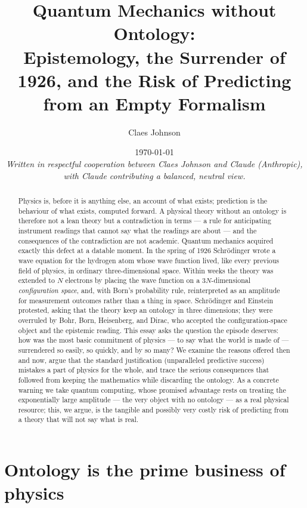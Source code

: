 \documentclass[11pt]{article}
\title{Quantum Mechanics without Ontology:\\
\large Epistemology, the Surrender of 1926, and the Risk of Predicting from an Empty Formalism}
\author[1]{Claes Johnson}
\affil[1]{KTH Royal Institute of Technology, SE-100 44 Stockholm, Sweden \\
\texttt{claesjohnson@gmail.com}}
\date{\today \\[0.5em]
\small\textit{Written in respectful cooperation between Claes Johnson and Claude (Anthropic), with Claude
contributing a balanced, neutral view.}}
\begin{document}
\maketitle

\begin{abstract}
Physics is, before it is anything else, an account of what exists; prediction is the behaviour of what exists,
computed forward. A physical theory without an ontology is therefore not a lean theory but a contradiction in
terms --- a rule for anticipating instrument readings that cannot say what the readings are about --- and the
consequences of the contradiction are not academic. Quantum mechanics acquired exactly this defect at a
datable moment. In the spring of 1926 Schr\"odinger wrote a wave equation for the hydrogen atom whose wave
function lived, like every previous field of physics, in ordinary three-dimensional space. Within weeks the
theory was extended to $N$ electrons by placing the wave function on a $3N$-dimensional \emph{configuration
space}, and, with Born's probability rule, reinterpreted as an amplitude for measurement outcomes rather than a
thing in space. Schr\"odinger and Einstein protested, asking that the theory keep an ontology in three
dimensions; they were overruled by Bohr, Born, Heisenberg, and Dirac, who accepted the configuration-space
object and the epistemic reading. This essay asks the question the episode deserves: how was the most basic
commitment of physics --- to say what the world is made of --- surrendered so easily, so quickly, and by so
many? We examine the reasons offered then and now, argue that the standard justification (unparalleled predictive
success) mistakes a part of physics for the whole, and trace the serious consequences that followed from keeping
the mathematics while discarding the ontology. As a concrete warning we take quantum computing, whose promised
advantage rests on treating the exponentially large amplitude --- the very object with no ontology --- as a real
physical resource; this, we argue, is the tangible and possibly very costly risk of predicting from a theory that
will not say what is real.
\end{abstract}


\section{Ontology is the prime business of physics}
\end{document}
